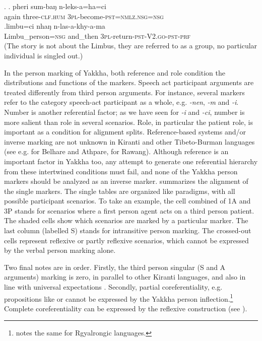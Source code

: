\ex. \ag.           pheri sum-baŋ       n-leks-a=ha=ci\\
again three{\scshape -clf.hum} {\scshape 3pl-}become{\scshape -pst=nmlz.nsg=nsg}\\
 
\bg.limbu=ci nhaŋ n-las-a-khy-a-ma\\
Limbu\_person{\scshape =nsg} and\_then {\scshape 3pl-}return{\scshape -pst-V2.go-pst-prf}\\
 (The story is not about the Limbus, they are referred to as  a group, no particular individual is singled out.) 


In the person marking of Yakkha, both reference and role condition the distributions and functions of the markers. Speech act participant arguments are treated differently from third person arguments. For instance, several markers refer to the category speech-act participant as a whole, e.g. \emph{-nen}, \emph{-m} and \emph{-i}. Number is another referential factor; as we have seen for \emph{-i} and \emph{-ci}, number is more salient than role in several scenarios. Role, in particular the patient role, is important as a condition for alignment splits. 
Reference-based systems and/or inverse marking are not unknown in Kiranti and other Tibeto-Burman languages  (see e.g. \citet{Ebert1991Inverse} for Belhare and Athpare, \citet{LaPolla2007Hierarchical} for Rawang). Although reference is an important factor in Yakkha too, any attempt to generate one referential hierarchy from these intertwined conditions must  fail, and none of the Yakkha person markers should be analyzed as an inverse marker.  summarizes  the alignment of the single markers. The single tables are organized like paradigms, with all possible participant scenarios. To take an example, the cell combined of 1A and 3P stands for scenarios where a first person agent acts on a third person patient. The shaded cells show which  scenarios are marked by a particular marker. The last column (labelled S) stands for intransitive person marking. The crossed-out cells represent reflexive or partly reflexive scenarios, which cannot be expressed by the verbal person marking alone.

Two final notes are in order. Firstly, the third person singular (S and A arguments) marking is zero, in parallel to other Kiranti languages, and also in line with universal expectations \citep{Siewierska2008_Person}. Secondly, partial coreferentiality, e.g. propositions like  or  cannot be expressed by the Yakkha person inflection.\footnote{\citet{Jacques2012_Agreement} notes the same for Rgyalrongic languages.}  Complete coreferentiality can be expressed by the  reflexive construction (see  ).


